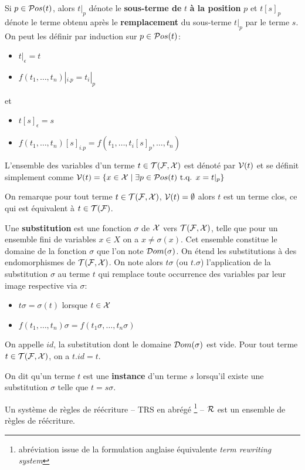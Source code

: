 Si $p \in \mathcal{ P}os(t)$, alors $t|_p$ dénote le \textbf{sous-terme de} $t$ \textbf{à la position} $p$ et
$t[s]_p$ dénote le terme obtenu après le \textbf{remplacement} du sous-terme $t|_p$ par le terme $s$.
On peut les définir par induction sur $p \in \mathcal{ P}os(t)$:
\begin{itemize}
\item $t|_\epsilon = t$
\item $f(t_1,\dots, t_n)|_{i.p} = t_i|_p$
\end{itemize}
et
\begin{itemize}
\item $t[s]_\epsilon = s$
\item $f(t_1,\dots, t_n)[s]_{i.p} = f(t_1,\dots, t_i[s]_p,\dots,t_n)$
\end{itemize}

\begin{definition}
  L'ensemble des variables d'un terme $t \in \mathcal{T(F, X)}$ est dénoté par $\mathcal V(t)$ et se définit simplement
  comme $\mathcal V(t) = \{ x \in \mathcal X \; | \; \exists p \in \mathcal{ P}os(t) \mbox{ t.q. } x = t|_p\}$
\end{definition}
On remarque pour tout terme $t \in \mathcal{T(F, X)}$, $\mathcal V(t) = \emptyset$ alors $t$ est un terme clos, ce qui est équivalent à $t \in \mathcal{T(F)}$.

\begin{definition}
  Une \textbf{substitution} est une fonction $\sigma$ de $\mathcal X$ vers $\mathcal{T(F, X)}$, telle que 
  pour un ensemble fini de variables $x \in X$ on a $x \not= \sigma(x)$. Cet
  ensemble constitue le domaine de la fonction $\sigma$ que l'on note $\mathcal{D}om(\sigma)$.
  On étend les substitutions à des endomorphismes de $\mathcal{T(F, X)}$. 
  On note alors $t\sigma$ (ou $t.\sigma$) l'application de la substitution $\sigma$ au terme $t$ 
  qui remplace toute occurrence des variables par leur image respective via $\sigma$:
  \begin{itemize}
  \item $t\sigma = \sigma(t)$ lorsque $t \in \mathcal X$
  \item $f(t_1, \dots, t_n)\sigma = f(t_1\sigma, \dots, t_n\sigma)$
  \end{itemize}
\end{definition}
On appelle $id$, la substitution dont le domaine $\mathcal{D}om(\sigma)$ est vide.
Pour tout terme $t \in \mathcal{T(F, X)}$, on a $t.id = t$.

On dit qu'un terme $t$ est une \textbf{instance} d'un terme $s$ lorsqu'il existe une substitution
$\sigma$ telle que $t = s\sigma$.

Un système de règles de réécriture -- TRS en abrégé
\footnote{\footnotesize abréviation issue de la formulation anglaise équivalente {\em term rewriting system}} -- 
$\mathcal R$ est un ensemble de règles de réécriture. 

